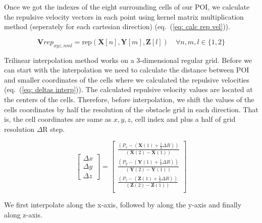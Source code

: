 \documentclass[letterpaper, 10 pt, conference]{ieeeconf}  %
\begin{document}
Once we got the indexes of the eight surrounding cells of our POI, we calculate the repulsive velocity vectors in each point using kernel matrix multiplication method (seperately for each cartesian direction) (eq.~(\ref{eq: calc rep vel})).

\begin{equation}
	\label{eq: calc rep vel}
	\mathbf{V}rep_{xyz,nml} = \mathrm{rep}(\mathbf{X}[n], \mathbf{Y}[m], \mathbf{Z}[l]) \quad \forall n, m, l \in \{1, 2\}
\end{equation}

Trilinear interpolation method works on a 3-dimensional regular grid. Before we can start with the interpolation we need to calculate the distance between POI and smaller coordinates of the cells where we calculated the repulsive velocities (eq.~(\ref{eq: deltas interp})). The calculated repulsive velocity values are located at the centers of the cells. Therefore, before interpolation, we shift the values of the cells coordinates by half the resolution of the obstacle grid in each direction. That is, the cell coordinates are same as $x,y,z$, cell index and plus a half of grid resolution $\Delta \mathrm{R}$ step.

\begin{equation}
	\label{eq: deltas interp}
	\begin{bmatrix}
		\Delta x \\
		\Delta y \\
		\Delta z		
	\end{bmatrix}
	=
	\begin{bmatrix}
		\frac{\left( P_x - \left( \mathbf{X}(1) + \frac{1}{2} \Delta \mathit{R} \right)  \right)}{\left( \mathbf{X}(2) - \mathbf{X}(1) \right)} \\
		\frac{\left( P_y - \left( \mathbf{Y}(1) + \frac{1}{2} \Delta \mathit{R} \right)  \right)}{\left( \mathbf{Y}(2) - \mathbf{Y}(1) \right)} \\
		\frac{\left( P_z - \left( \mathbf{Z}(1) + \frac{1}{2} \Delta \mathit{R} \right)  \right)}{\left( \mathbf{Z}(2) - \mathbf{Z}(1) \right)} \\
	\end{bmatrix}
\end{equation}

We first interpolate along the x-axis, followed by along the y-axis and finally along z-axis.
	
\end{document}
